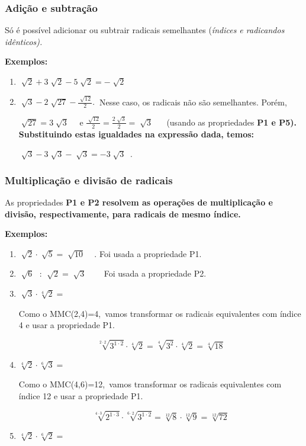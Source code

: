 \subsubsection{Adição e subtração}

Só é possível adicionar ou subtrair radicais semelhantes (\textit{índices e radicandos idênticos). }

\textbf{Exemplos:}

\begin{enumerate}
	\item  \( \sqrt[]{2}+3\sqrt[]{2}-5\sqrt[]{2}=-\sqrt[]{2} \) 

	\item  \( \sqrt[]{3}-2\sqrt[]{27}-\frac{\sqrt[]{12}}{2}.~ \)  Nesse caso, os radicais não são semelhantes. Porém,

 \( \sqrt[]{27}=3\sqrt[]{3} \) ~~e   \( \frac{\sqrt[]{12}}{2}=\frac{2\sqrt[]{3}}{2}=\sqrt[]{3} \) ~~ (usando as propriedades \textbf{P1 e P5). Substituindo estas igualdades na expressão dada, temos:}

 \( \sqrt[]{3}-3\sqrt[]{3}-\sqrt[]{3}=-3\sqrt[]{3}~ \) .
\end{enumerate}
	\subsubsection{Multiplicação e divisão de radicais}

As propriedades \textbf{P1 e P2 resolvem as operações de multiplicação e divisão, respectivamente, para radicais de mesmo índice. }

\textbf{Exemplos:}

\begin{enumerate}
	\item  \( \sqrt[]{2} \cdot \sqrt[]{5}=\sqrt[]{10} \) ~ . Foi usada a propriedade P1.

	\item  \( \sqrt[]{6}\text{~ : }\sqrt[]{2}=\sqrt[]{3} \) ~~~ Foi usada a propriedade P2.

	\item  \( \sqrt[]{3} \cdot \sqrt[4]{2}= \) 

Como o MMC(2,4)=4,~vamos transformar os radicais equivalentes com índice  4 e usar a propriedade P1.

 \[ \sqrt[2 \cdot 2]{3^{1 \cdot 2}} \cdot \sqrt[4]{2}=\sqrt[4]{3^{2}} \cdot \sqrt[4]{2}=\sqrt[4]{18} \] 

	\item  \( \sqrt[4]{2} \cdot \sqrt[6]{3}= \) 

Como o MMC(4,6)=12,~vamos transformar os radicais equivalentes com índice  12 e usar a propriedade P1.

 \[ \sqrt[4 \cdot 3]{2^{1 \cdot 3}} \cdot \sqrt[6 \cdot 2]{3^{1 \cdot 2}}=\sqrt[12]{8} \cdot \sqrt[12]{9}=\sqrt[12]{72} \] 

	\item  \( \sqrt[4]{2} \cdot \sqrt[6]{2}= \) 
\end{enumerate}

